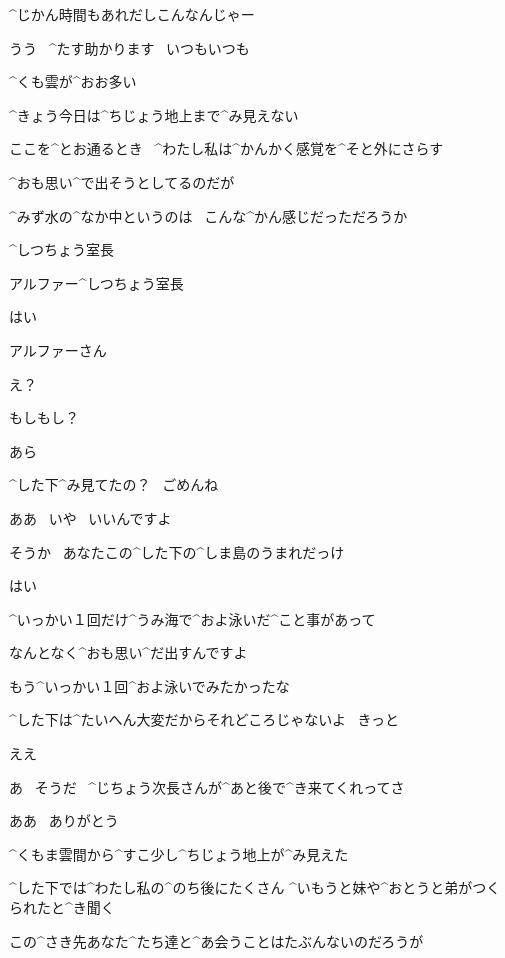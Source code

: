 \Alpha ^{じかん}{時間}もあれだしこんなんじゃー

\Kokone うう
\ ^{たす}{助}かります
\ いつもいつも

\page[42]
\ASevenMOne ^{くも}{雲}が^{おお}{多}い

\ASevenMOne ^{きょう}{今日}は^{ちじょう}{地上}まで^{み}{見}えない

\page[43]
\ASevenMOne ここを^{とお}{通}るとき
\ ^{わたし}{私}は^{かんかく}{感覚}を^{そと}{外}にさらす

\page[44]
\ASevenMOne ^{おも}{思}い^{で}{出}そうとしてるのだが

\ASevenMOne ^{みず}{水}の^{なか}{中}というのは
\ こんな^{かん}{感}じだっただろうか

\page[45]
\Person ^{しつちょう}{室長}

\Person アルファー^{しつちょう}{室長}

\ASevenMOne はい

\Person アルファーさん

\ASevenMOne え？

\Person もしもし？

\Person あら

\Person ^{した}{下}^{み}{見}てたの？
\ ごめんね

\page[46]
\ASevenMOne ああ
\ いや
\ いいんですよ

\Person そうか
\ あなたこの^{した}{下}の^{しま}{島}のうまれだっけ

\ASevenMOne はい

\ASevenMOne ^{いっかい}{１回}だけ^{うみ}{海}で^{およ}{泳}いだ^{こと}{事}があって

\ASevenMOne なんとなく^{おも}{思}い^{だ}{出}すんですよ

\page[47]
\ASevenMOne もう^{いっかい}{１回}^{およ}{泳}いでみたかったな

\Person ^{した}{下}は^{たいへん}{大変}だからそれどころじゃないよ
\ きっと

\ASevenMOne ええ

\Person あ
\ そうだ
\ ^{じちょう}{次長}さんが^{あと}{後}で^{き}{来}てくれってさ

\ASevenMOne ああ
\ ありがとう

\page[48]
\ASevenMOne ^{くもま}{雲間}から^{すこ}{少}し^{ちじょう}{地上}が^{み}{見}えた

\ASevenMOne ^{した}{下}では^{わたし}{私}の^{のち}{後}にたくさん
^{いもうと}{妹}や^{おとうと}{弟}がつくられたと^{き}{聞}く

\page[49]
\ASevenMOne この^{さき}{先}あなた^{たち}{達}と^{あ}{会}うことはたぶんないのだろうが


